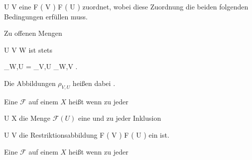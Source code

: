 \mavergleichskette
{\vergleichskette
{U
}
{ \subseteq }{V
}
{  }{
}
{    }{
}
{   }{
}
}
{}{}{}
eine
 { { \mathcal  F   }  \left(   V   \right)   } { { \mathcal  F   }  \left(   U   \right)
} {}
zuordnet, wobei diese Zuordnung die beiden folgenden Bedingungen erfüllen muss.
 {Zu offenen Mengen

\mavergleichskettedisp
{\vergleichskette
{U
}
{ \subseteq} { V
}
{ \subseteq} { W
}
{ } {
}
{ } {
}
}
{}{}{}
ist stets

\mavergleichskettedisp
{\vergleichskette
{ \rho_{W,U}
}
{ =} { \rho_{V,U} \circ  \rho_{W,V}
}
{ } {
}
{ } {
}
{ } {
}
}
{}{}{.}
}






Die Abbildungen $\rho_{V,U}$ heißen dabei  {.}







Eine
${ \mathcal  F   }$ auf einem
$X$ heißt
wenn zu jeder

\mavergleichskette
{\vergleichskette
{U
}
{ \subseteq }{ X
}
{  }{
}
{    }{
}
{   }{
}
}
{}{}{}
die Menge ${ \mathcal  F   }  \left(   U   \right)$ eine
und zu jeder Inklusion

\mavergleichskette
{\vergleichskette
{U
}
{ \subseteq }{ V
}
{  }{
}
{    }{
}
{   }{
}
}
{}{}{}
die Restriktionsabbildung
 { { \mathcal  F   }  \left(   V   \right) } { { \mathcal  F   }  \left(   U   \right)
} {}
ein
ist.











Eine
${ \mathcal  F   }$ auf einem
$X$ heißt
wenn zu jeder

